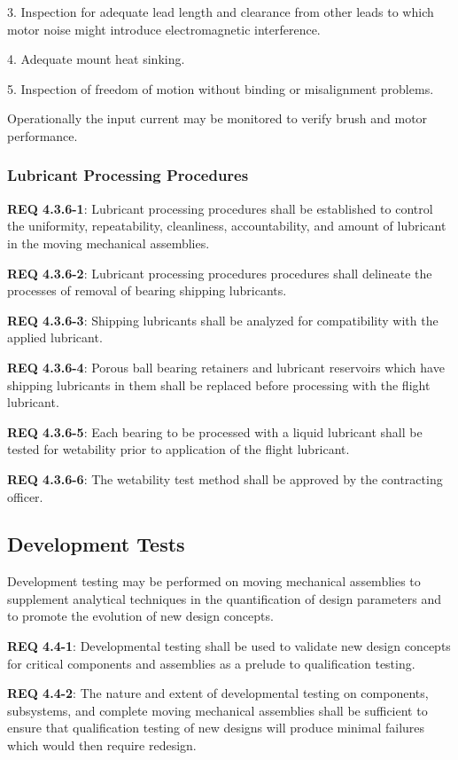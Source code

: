 \documentclass[12pt]{article}
\begin{document}
3. Inspection for adequate lead length and clearance from other leads to which motor noise might introduce electromagnetic interference.

4. Adequate mount heat sinking.

5. Inspection of freedom of motion without binding or misalignment problems.

Operationally the input current may be monitored to verify brush and motor performance.


\subsubsection{Lubricant Processing Procedures} %
\noindent \textbf{REQ 4.3.6-1}: Lubricant processing procedures shall be established to control the uniformity, repeatability, cleanliness, accountability, and amount of lubricant in the moving mechanical assemblies. 

\noindent \textbf{REQ 4.3.6-2}: Lubricant processing procedures procedures shall delineate the processes of removal of bearing shipping lubricants. 

\noindent \textbf{REQ 4.3.6-3}: Shipping lubricants shall be analyzed for compatibility with the applied lubricant. 

\noindent \textbf{REQ 4.3.6-4}: Porous ball bearing retainers and lubricant reservoirs which have shipping lubricants in them shall be replaced before processing with the flight lubricant. 

\noindent \textbf{REQ 4.3.6-5}: Each bearing to be processed with a liquid lubricant shall be tested for wetability prior to application of the flight lubricant. 

\noindent \textbf{REQ 4.3.6-6}: The wetability test method shall be approved by the contracting officer.


\subsection{Development Tests} %
Development testing may be performed on moving mechanical assemblies to supplement analytical techniques in the quantification of design parameters and to promote the evolution of new design concepts.

\noindent \textbf{REQ 4.4-1}: Developmental testing shall be used to validate new design concepts for critical components and assemblies as a prelude to qualification testing. 

\noindent \textbf{REQ 4.4-2}: The nature and extent of developmental testing on components, subsystems, and complete moving mechanical assemblies shall be sufficient to ensure that qualification testing of new designs will produce minimal failures which would then require redesign. 
\end{document}

